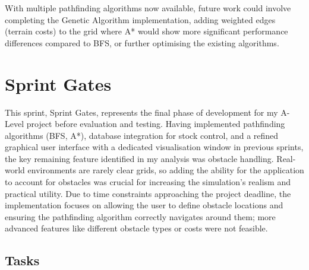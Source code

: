 With multiple pathfinding algorithms now available, future work could involve completing the Genetic Algorithm implementation, adding weighted edges (terrain costs) to the grid where A* would show more significant performance differences compared to BFS, or further optimising the existing algorithms.

\newpage

\section{Sprint Gates}

This sprint, Sprint Gates, represents the final phase of development for my A-Level project before evaluation and testing. Having implemented pathfinding algorithms (BFS, A*), database integration for stock control, and a refined graphical user interface with a dedicated visualisation window in previous sprints, the key remaining feature identified in my analysis was obstacle handling. Real-world environments are rarely clear grids, so adding the ability for the application to account for obstacles was crucial for increasing the simulation's realism and practical utility. Due to time constraints approaching the project deadline, the implementation focuses on allowing the user to define obstacle locations and ensuring the pathfinding algorithm correctly navigates around them; more advanced features like different obstacle types or costs were not feasible.

\subsection{Tasks}

